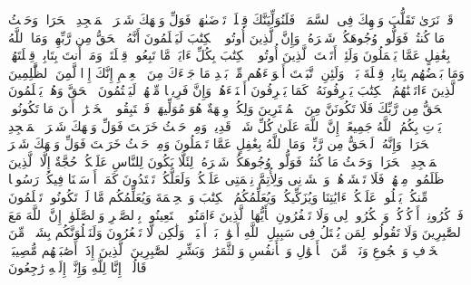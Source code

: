 \startbuffer[\q:2:144]
قَدۡ نَرَىٰ تَقَلُّبَ وَجۡهِكَ فِی ٱلسَّمَاۤءِۖ فَلَنُوَلِّیَنَّكَ قِبۡلَةࣰ تَرۡضَىٰهَاۚ فَوَلِّ وَجۡهَكَ شَطۡرَ ٱلۡمَسۡجِدِ ٱلۡحَرَامِۚ وَحَیۡثُ مَا كُنتُمۡ فَوَلُّوا۟ وُجُوهَكُمۡ شَطۡرَهُۥۗ وَإِنَّ ٱلَّذِینَ أُوتُوا۟ ٱلۡكِتَٰبَ لَیَعۡلَمُونَ أَنَّهُ ٱلۡحَقُّ مِن رَّبِّهِمۡۗ وَمَا ٱللَّهُ بِغَٰفِلٍ عَمَّا یَعۡمَلُونَ%
\stopbuffer%
\startbuffer[\q:2:145]
وَلَئِنۡ أَتَیۡتَ ٱلَّذِینَ أُوتُوا۟ ٱلۡكِتَٰبَ بِكُلِّ ءَایَةࣲ مَّا تَبِعُوا۟ قِبۡلَتَكَۚ وَمَاۤ أَنتَ بِتَابِعࣲ قِبۡلَتَهُمۡۚ وَمَا بَعۡضُهُم بِتَابِعࣲ قِبۡلَةَ بَعۡضࣲۚ وَلَئِنِ ٱتَّبَعۡتَ أَهۡوَاۤءَهُم مِّنۢ بَعۡدِ مَا جَاۤءَكَ مِنَ ٱلۡعِلۡمِ إِنَّكَ إِذࣰا لَّمِنَ ٱلظَّٰلِمِینَ%
\stopbuffer%
\startbuffer[\q:2:146]
ٱلَّذِینَ ءَاتَیۡنَٰهُمُ ٱلۡكِتَٰبَ یَعۡرِفُونَهُۥ كَمَا یَعۡرِفُونَ أَبۡنَاۤءَهُمۡۖ وَإِنَّ فَرِیقࣰا مِّنۡهُمۡ لَیَكۡتُمُونَ ٱلۡحَقَّ وَهُمۡ یَعۡلَمُونَ%
\stopbuffer%
\startbuffer[\q:2:147]
ٱلۡحَقُّ مِن رَّبِّكَ فَلَا تَكُونَنَّ مِنَ ٱلۡمُمۡتَرِینَ%
\stopbuffer%
\startbuffer[\q:2:148]
وَلِكُلࣲّ وِجۡهَةٌ هُوَ مُوَلِّیهَاۖ فَٱسۡتَبِقُوا۟ ٱلۡخَیۡرَٰتِۚ أَیۡنَ مَا تَكُونُوا۟ یَأۡتِ بِكُمُ ٱللَّهُ جَمِیعًاۚ إِنَّ ٱللَّهَ عَلَىٰ كُلِّ شَیۡءࣲ قَدِیرࣱ%
\stopbuffer%
\startbuffer[\q:2:149]
وَمِنۡ حَیۡثُ خَرَجۡتَ فَوَلِّ وَجۡهَكَ شَطۡرَ ٱلۡمَسۡجِدِ ٱلۡحَرَامِۖ وَإِنَّهُۥ لَلۡحَقُّ مِن رَّبِّكَۗ وَمَا ٱللَّهُ بِغَٰفِلٍ عَمَّا تَعۡمَلُونَ%
\stopbuffer%
\startbuffer[\q:2:150]
وَمِنۡ حَیۡثُ خَرَجۡتَ فَوَلِّ وَجۡهَكَ شَطۡرَ ٱلۡمَسۡجِدِ ٱلۡحَرَامِۚ وَحَیۡثُ مَا كُنتُمۡ فَوَلُّوا۟ وُجُوهَكُمۡ شَطۡرَهُۥ لِئَلَّا یَكُونَ لِلنَّاسِ عَلَیۡكُمۡ حُجَّةٌ إِلَّا ٱلَّذِینَ ظَلَمُوا۟ مِنۡهُمۡ فَلَا تَخۡشَوۡهُمۡ وَٱخۡشَوۡنِی وَلِأُتِمَّ نِعۡمَتِی عَلَیۡكُمۡ وَلَعَلَّكُمۡ تَهۡتَدُونَ%
\stopbuffer%
\startbuffer[\q:2:151]
كَمَاۤ أَرۡسَلۡنَا فِیكُمۡ رَسُولࣰا مِّنكُمۡ یَتۡلُوا۟ عَلَیۡكُمۡ ءَایَٰتِنَا وَیُزَكِّیكُمۡ وَیُعَلِّمُكُمُ ٱلۡكِتَٰبَ وَٱلۡحِكۡمَةَ وَیُعَلِّمُكُم مَّا لَمۡ تَكُونُوا۟ تَعۡلَمُونَ%
\stopbuffer%
\startbuffer[\q:2:152]
فَٱذۡكُرُونِیۤ أَذۡكُرۡكُمۡ وَٱشۡكُرُوا۟ لِی وَلَا تَكۡفُرُونِ%
\stopbuffer%
\startbuffer[\q:2:153]
یَٰۤأَیُّهَا ٱلَّذِینَ ءَامَنُوا۟ ٱسۡتَعِینُوا۟ بِٱلصَّبۡرِ وَٱلصَّلَوٰةِۚ إِنَّ ٱللَّهَ مَعَ ٱلصَّٰبِرِینَ%
\stopbuffer%
\startbuffer[\q:2:154]
وَلَا تَقُولُوا۟ لِمَن یُقۡتَلُ فِی سَبِیلِ ٱللَّهِ أَمۡوَٰتُۢۚ بَلۡ أَحۡیَاۤءࣱ وَلَٰكِن لَّا تَشۡعُرُونَ%
\stopbuffer%
\startbuffer[\q:2:155]
وَلَنَبۡلُوَنَّكُم بِشَیۡءࣲ مِّنَ ٱلۡخَوۡفِ وَٱلۡجُوعِ وَنَقۡصࣲ مِّنَ ٱلۡأَمۡوَٰلِ وَٱلۡأَنفُسِ وَٱلثَّمَرَٰتِۗ وَبَشِّرِ ٱلصَّٰبِرِینَ%
\stopbuffer%
\startbuffer[\q:2:156]
ٱلَّذِینَ إِذَاۤ أَصَٰبَتۡهُم مُّصِیبَةࣱ قَالُوۤا۟ إِنَّا لِلَّهِ وَإِنَّاۤ إِلَیۡهِ رَٰجِعُونَ%
\stopbuffer%
\startbuffer[\q:2:157]
